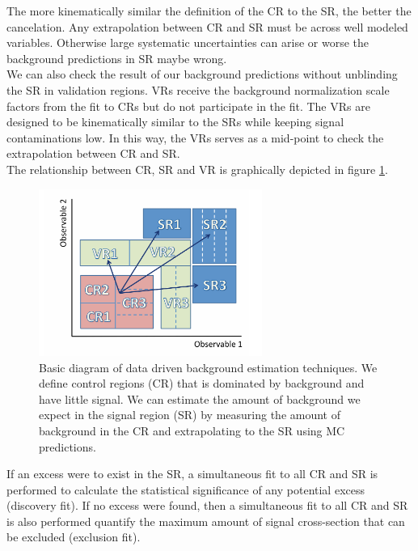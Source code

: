 \indent The more kinematically similar the definition of the CR to the SR, the better the cancelation.  Any extrapolation between CR and SR must be across well modeled variables.  Otherwise large systematic uncertainties can arise or worse the background predictions in SR maybe wrong.  \\

\indent We can also check the result of our background predictions without unblinding the SR in validation regions.  VRs receive the background normalization scale factors from the fit to CRs but do not participate in the fit.   The VRs are designed to be kinematically similar to the SRs while keeping signal contaminations low.  In this way, the VRs serves as a mid-point to check the extrapolation between CR and SR.  \\

\indent The relationship between CR, SR and VR is graphically depicted in figure \ref{fig:CR_VR_SR_stat}. \\

\begin{figure}[h!]
  \centering
	\includegraphics[width=0.65\textwidth]{./figures/statistics/CR_VR_SR.pdf}
\caption{\label{fig:CR_VR_SR_stat}{Basic diagram of data driven background estimation techniques.  We define control regions (CR) that is dominated by background and have little signal.  We can estimate the amount of background we expect in the signal region (SR) by measuring the amount of background in the CR and extrapolating to the SR using MC predictions. }}
\end{figure}

\indent If an excess were to exist in the SR, a simultaneous fit to all CR and SR is performed to calculate the statistical significance of any potential excess (discovery fit).   If no excess were found, then a simultaneous fit to all CR and SR is also performed quantify the maximum amount of signal cross-section that can be excluded (exclusion fit).  \\

